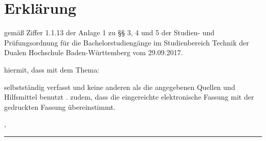 
\section*{Erklärung}

\vspace*{2em}

gemäß Ziffer 1.1.13 der Anlage 1 zu §§ 3, 4 und 5  der Studien- und Prüfungsordnung für die Bachelorstudiengänge im Studienbereich Technik der Dualen Hochschule Baden-Württemberg vom 29.09.2017.
  
 hiermit, dass  
{\documentTypePhrase} mit dem Thema: 
\vspace{3em}
\begin{addmargin}[25pt]{0pt}
\Large {\itshape \documentTitle }
\end{addmargin}
\vspace{3em}
selbstständig verfasst und  keine anderen als die angegebenen Quellen und Hilfsmittel benutzt . 
 zudem, dass die eingereichte elektronische Fassung mit der gedruckten Fassung 
übereinstimmt. 

\vspace{3em}

\releaseLocation, \releaseDate
\vspace{4em}

\rule{6cm}{0.4pt}

\documentAuthor
\pagebreak
